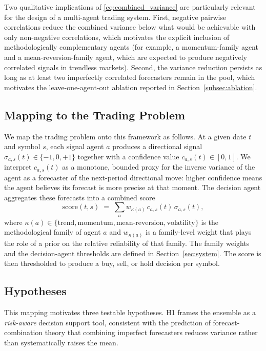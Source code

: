 \documentclass{ieeeaccess}
\begin{document}
Two qualitative implications of \eqref{eq:combined_variance} are particularly relevant for the design of a multi-agent trading system. First, negative pairwise correlations reduce the combined variance below what would be achievable with only non-negative correlations, which motivates the explicit inclusion of methodologically complementary agents (for example, a momentum-family agent and a mean-reversion-family agent, which are expected to produce negatively correlated signals in trendless markets). Second, the variance reduction persists as long as at least two imperfectly correlated forecasters remain in the pool, which motivates the leave-one-agent-out ablation reported in Section~\ref{subsec:ablation}.

\subsection{Mapping to the Trading Problem}

We map the trading problem onto this framework as follows. At a given date $t$ and symbol $s$, each signal agent $a$ produces a directional signal $\sigma_{a,s}(t) \in \{-1, 0, +1\}$ together with a confidence value $c_{a,s}(t) \in [0, 1]$. We interpret $c_{a,s}(t)$ as a monotone, bounded proxy for the inverse variance of the agent as a forecaster of the next-period directional move: higher confidence means the agent believes its forecast is more precise at that moment. The decision agent aggregates these forecasts into a combined score
\begin{equation}
\mathrm{score}(t, s) \;=\; \sum_{a} w_{\kappa(a)} \, c_{a,s}(t) \, \sigma_{a,s}(t),
\label{eq:score}
\end{equation}
where $\kappa(a) \in \{\text{trend}, \text{momentum}, \text{mean-reversion}, \text{volatility}\}$ is the methodological family of agent $a$ and $w_{\kappa(a)}$ is a family-level weight that plays the role of a prior on the relative reliability of that family. The family weights and the decision-agent thresholds are defined in Section~\ref{sec:system}. The score is then thresholded to produce a buy, sell, or hold decision per symbol.

\subsection{Hypotheses}

This mapping motivates three testable hypotheses. H1 frames the ensemble as a \emph{risk-aware} decision support tool, consistent with the prediction of forecast-combination theory that combining imperfect forecasters reduces variance rather than systematically raises the mean.
\end{document}
